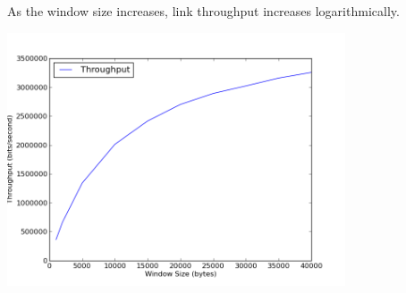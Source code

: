\documentclass[11pt]{article}
\begin{document}
As the window size increases, link throughput increases logarithmically.
\begin{center}
\includegraphics[width=10cm]{../throughputs.png}
\end{center}

\vspace{0.5cm}
\end{document}
